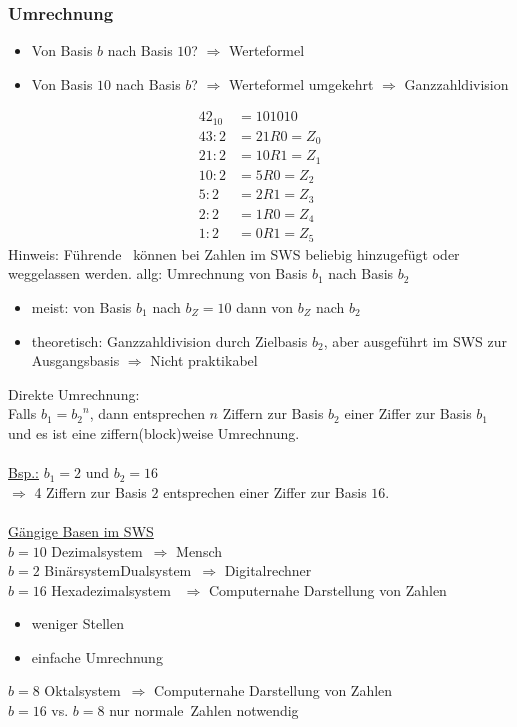 \documentclass[10pt,a4paper]{scrartcl}
\begin{document}
	\subsubsection*{Umrechnung}
	\begin{itemize}
		\item Von Basis $b$ nach Basis $10$?
		\subitem $\Rightarrow$ Werteformel
		\item Von Basis $10$ nach Basis $ b $?
		\subitem $ \Rightarrow $ Werteformel umgekehrt
		\subitem $ \Rightarrow $ Ganzzahldivision
	\end{itemize}
	\begin{equation}
	\begin{split}
	{42}_{10} &= 101010\\	
	43:2 &= 21R0 = Z_0\\
	21:2 &= 10R1 = Z_1\\
	10:2 &= 5R0 = Z_2\\
	5:2  &= 2R1 = Z_3\\
	2:2  &= 1R0 =Z_4\\
	1:2	&= 0R1 = Z_5
	\end{split}
	\end{equation}
	Hinweis: Führende  \grqq\ können bei Zahlen im SWS beliebig hinzugefügt oder weggelassen werden. 
	allg: Umrechnung von Basis $b_1$ nach Basis $b_2$
	\begin{itemize}
		\item meist: von Basis $b_1$ nach $b_Z=10$ dann von $b_Z$ nach $b_2$
		\item theoretisch: Ganzzahldivision durch Zielbasis $b_2$, aber ausgeführt im SWS zur Ausgangsbasis $\Rightarrow$ Nicht praktikabel
	\end{itemize}
	Direkte Umrechnung:\\
	Falls $ b_1 = {b_2}^n $, dann entsprechen $n$ Ziffern zur Basis $ b_2 $ einer Ziffer zur Basis $ b_1 $ und es ist eine ziffern(block)weise Umrechnung.\\
	\\
	\underline{Bsp.:} $ b_1=2 $ und $ b_2=16 $\\
	$ \Rightarrow $ 4 Ziffern zur Basis $ 2 $ entsprechen einer Ziffer zur Basis $ 16 $.\\ \\
	
	\underline{Gängige Basen im SWS}\\
	$ b=10 $ \glqq Dezimalsystem\grqq\ $ \Rightarrow $ Mensch\\
	$ b=2 $ \glqq Binärsystem\grqq\/\glqq Dualsystem\grqq\ $ \Rightarrow $ Digitalrechner \\
	$ b=16 $ \glqq Hexadezimalsystem \grqq\ $ \Rightarrow $ Computernahe Darstellung von Zahlen
	\begin{itemize}
		\item weniger Stellen
		\item einfache Umrechnung
	\end{itemize}
	$ b=8 $ \glqq Oktalsystem\grqq\ $ \Rightarrow $ Computernahe Darstellung von Zahlen\\
	$ b=16 $ vs. $ b=8 $ nur \glqq normale\grqq\ Zahlen notwendig
	
\end{document}
